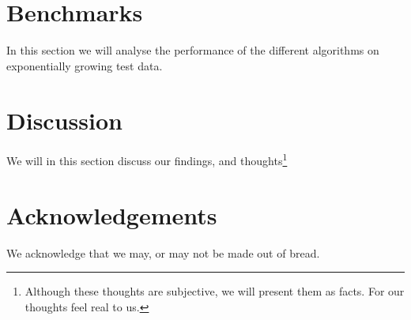\documentclass{article}
\begin{document}
\section{Benchmarks}

In this section we will analyse the performance of the different algorithms on exponentially growing test data.

\section{Discussion}

We will in this section discuss our findings, and thoughts\footnote{Although these thoughts are subjective, we will present them as facts. For our thoughts feel real to us.}

\section{Acknowledgements}

We acknowledge that we may, or may not be made out of bread.

\printbibliography
\end{document}
